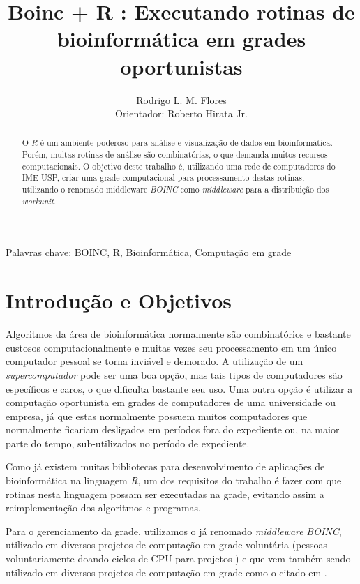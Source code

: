 \documentclass[b1]{sciposter}
\title{Boinc + R : Executando rotinas de bioinformática em grades oportunistas}
\author{Rodrigo L. M. Flores \\ Orientador: Roberto Hirata Jr. }
\institute{Instituto de Matemática e Estatística\\
           Universidade de São Paulo\\
           }
\begin{document}
\maketitle

\renewcommand{\papertype}{b1}

\begin{multicols}{2}


Palavras chave: BOINC, R, Bioinformática, Computação em grade

\begin{abstract}
O \textit{R} é um ambiente poderoso para análise e visualização de dados em bioinformática.  
Porém, muitas rotinas de análise são combinatórias, o que demanda muitos recursos computacionais. 
O objetivo deste trabalho é, utilizando uma rede de computadores do IME-USP, criar uma grade computacional para processamento 
destas rotinas, utilizando o renomado middleware \textit{BOINC} como \textit{middleware} para
a distribuição dos \textit{workunit}.

\end{abstract}

\section{Introdução e Objetivos}

Algoritmos da área de bioinformática normalmente são combinatórios e bastante custosos computacionalmente
e muitas vezes seu processamento em um único computador pessoal se torna inviável e demorado. A utilização de um 
\textit{supercomputador} pode ser uma boa opção, mas tais tipos de computadores são específicos e caros, o que 
dificulta bastante seu uso. Uma outra opção é utilizar a computação oportunista em grades de computadores de 
uma universidade ou empresa, já que estas normalmente possuem muitos computadores que normalmente ficariam desligados
 em períodos fora do expediente ou, na maior parte do tempo, sub-utilizados no período de expediente. 

Como já existem muitas bibliotecas para desenvolvimento de aplicações de bioinformática na linguagem \textit{R}, um dos
requisitos do trabalho é fazer com que rotinas nesta linguagem possam ser executadas na grade, evitando assim 
a reimplementação dos algoritmos e programas. 

Para o gerenciamento da grade, utilizamos o já renomado \textit{middleware} \emph{BOINC}, utilizado em diversos projetos
de computação em grade voluntária (pessoas voluntariamente doando ciclos de CPU para projetos ) e que vem também sendo utilizado
em diversos projetos de computação em grade como o citado em \cite{boinc}.


\end{multicols}
\end{document}
